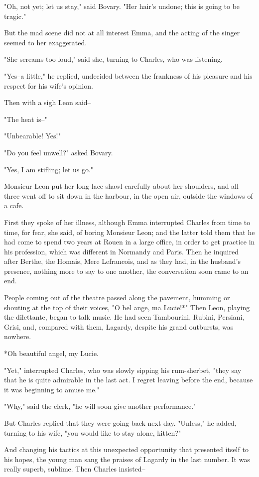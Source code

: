 \documentclass{tufte-book}
\begin{document}
"Oh, not yet; let us stay," said Bovary. "Her hair's undone; this is
going to be tragic."

But the mad scene did not at all interest Emma, and the acting of the
singer seemed to her exaggerated.

"She screams too loud," said she, turning to Charles, who was listening.

"Yes--a little," he replied, undecided between the frankness of his
pleasure and his respect for his wife's opinion.

Then with a sigh Leon said--

"The heat is--"

"Unbearable! Yes!"

"Do you feel unwell?" asked Bovary.

"Yes, I am stifling; let us go."

Monsieur Leon put her long lace shawl carefully about her shoulders, and
all three went off to sit down in the harbour, in the open air, outside
the windows of a cafe.

First they spoke of her illness, although Emma interrupted Charles
from time to time, for fear, she said, of boring Monsieur Leon; and the
latter told them that he had come to spend two years at Rouen in a large
office, in order to get practice in his profession, which was different
in Normandy and Paris. Then he inquired after Berthe, the Homais, Mere
Lefrancois, and as they had, in the husband's presence, nothing more to
say to one another, the conversation soon came to an end.

People coming out of the theatre passed along the pavement, humming or
shouting at the top of their voices, "O bel ange, ma Lucie!*" Then Leon,
playing the dilettante, began to talk music. He had seen Tambourini,
Rubini, Persiani, Grisi, and, compared with them, Lagardy, despite his
grand outbursts, was nowhere.

     *Oh beautiful angel, my Lucie.


"Yet," interrupted Charles, who was slowly sipping his rum-sherbet,
"they say that he is quite admirable in the last act. I regret leaving
before the end, because it was beginning to amuse me."

"Why," said the clerk, "he will soon give another performance."

But Charles replied that they were going back next day. "Unless," he
added, turning to his wife, "you would like to stay alone, kitten?"

And changing his tactics at this unexpected opportunity that presented
itself to his hopes, the young man sang the praises of Lagardy in the
last number. It was really superb, sublime. Then Charles insisted--
\end{document}
